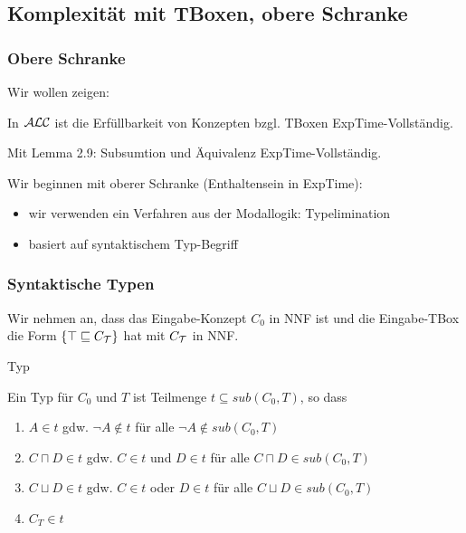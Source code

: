 \subsection{Komplexität mit TBoxen, obere
Schranke}\label{komplexituxe4t-mit-tboxen-obere-schranke}

\subsubsection{Obere Schranke}

Wir wollen zeigen:

\begin{theorem}
In $\mathcal{A}\mathcal{L}\mathcal{C}$ ist die Erfüllbarkeit von Konzepten bzgl. TBoxen
ExpTime-Vollständig.
\end{theorem}

Mit Lemma 2.9: Subsumtion und Äquivalenz ExpTime-Vollständig.

Wir beginnen mit oberer Schranke (Enthaltensein in ExpTime):

\begin{itemize}
  \item wir verwenden ein Verfahren aus der Modallogik: Typelimination
  \item basiert auf syntaktischem Typ-Begriff
\end{itemize}

\subsubsection{Syntaktische Typen}\label{synt-typ}

Wir nehmen an, dass das Eingabe-Konzept $C_0$ in NNF ist und die Eingabe-TBox die Form $\{\top \sqsubseteq C_{\mathcal{T}}\}$ hat mit $C_{\mathcal{T}}$ in NNF.

\begin{definition}{Typ}

Ein Typ für $C_{0}$ und $T$ ist Teilmenge
$t \subseteq sub\left( C_{0},T \right)$, so dass

\begin{enumerate}
\def\labelenumi{\arabic{enumi}.}
\item
  $A \in t$ gdw. $\neg A \notin t$ für alle
  $\neg A \notin sub\left( C_{0},T \right)$
\item
  $C \sqcap D \in t$ gdw. $C \in t$ und $D \in t$ für alle
  $C \sqcap D \in sub\left( C_{0},T \right)$
\item
  $C \sqcup D \in t$ gdw. $C \in t$ oder $D \in t$ für alle
  $C \sqcup D \in sub\left( C_{0},T \right)$
\item
  $C_{T} \in t$
\end{enumerate}
\end{definition}

